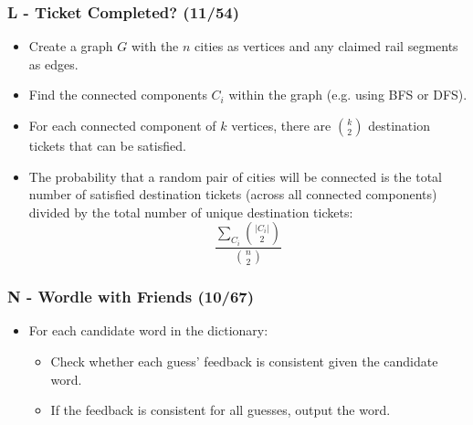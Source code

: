 \documentclass{beamer}
\begin{document}




\begin{frame}
\frametitle{L - Ticket Completed? (11/54)}
\begin{itemize}
\setlength\itemsep{0.5\baselineskip}
\item Create a graph $G$ with the $n$ cities as vertices and any claimed rail segments as edges.
\item Find the connected components $C_{i}$ within the graph (e.g. using BFS or DFS).
\item For each connected component of $k$ vertices, there are ${k \choose 2}$ destination tickets that can be satisfied.
\item The probability that a random pair of cities will be connected is the total number of satisfied destination tickets (across all connected components) divided by the total number of unique destination tickets:
\[
	\frac{\sum_{C_{i}} {|C_{i}| \choose 2}}{{ n \choose 2 }}
\]
\end{itemize}
\end{frame}


\begin{frame}
\frametitle{N - Wordle with Friends (10/67)}
\begin{itemize}
\setlength\itemsep{0.5\baselineskip}
\item For each candidate word in the dictionary:
	\begin{itemize}
		\item Check whether each guess' feedback is consistent given the candidate word.
		\item If the feedback is consistent for all guesses, output the word.
	\end{itemize}
\end{itemize}
\end{frame}

\end{document}

